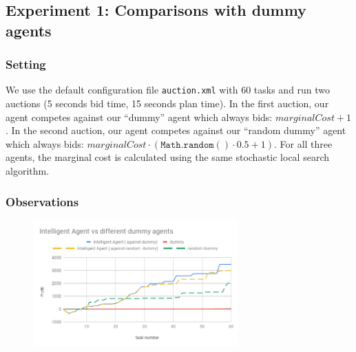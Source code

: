 \documentclass[11pt]{article}
\begin{document}
  \subsection{Experiment 1: Comparisons with dummy agents}


  \subsubsection{Setting}

  
  We use the default configuration file \texttt{auction.xml} with 60 tasks and
  run two auctions (5 seconds bid time, 15 seconds plan time). In the first
  auction, our agent competes against our ``dummy'' agent which always bids:
  $marginalCost + 1$. In the second auction, our agent competes against our
  ``random dummy'' agent which always bids: $marginalCost \cdot
  (\mathtt{Math.random()} \cdot 0.5 + 1)$. For all three agents, the marginal
  cost is calculated using the same stochastic local search algorithm.

  \newpage

  \subsubsection{Observations}
  
    \begin{figure}
      \vspace{-20pt}
    \label{fig1}
 \includegraphics[width=0.7\textwidth]{dummy.png}
 \vspace{-20pt}
 \end{figure} 
  
\end{document}
